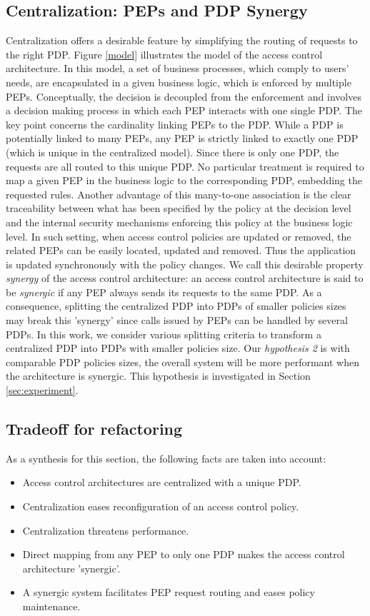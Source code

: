 \subsection{Centralization: PEPs and PDP Synergy}
Centralization offers a desirable feature by simplifying the routing of requests to the right PDP. 
Figure \ref{model} illustrates the model of the access control architecture. In this model, a set of business processes, which comply to users' needs, are encapsulated 
in a given business logic, which is enforced by multiple PEPs. Conceptually, the decision is decoupled from the enforcement and involves a decision making process in which each PEP 
interacts with one single PDP. The key point concerns the cardinality linking PEPs to the PDP. While a PDP is potentially linked to many PEPs, any PEP is strictly linked to exactly one 
PDP (which is unique in the centralized model). 
Since there is only one PDP, the requests are all routed to this unique PDP. No particular treatment is required to map a given PEP in the business logic to 
the corresponding PDP, embedding the requested rules. Another advantage of this many-to-one association is the clear traceability between what has been specified by the 
policy at the decision level and the internal security mechanisms enforcing this policy at the business logic level. In such setting, 
when access control policies are updated or removed, the related PEPs can be easily located, updated and removed. Thus the application is updated synchronously 
with the policy changes. We call this desirable property \textit{synergy} of the access control architecture: an access control architecture is said to be \textit{synergic} if any PEP always sends 
its requests to the same PDP. 
As a consequence, splitting the centralized PDP into PDPs of smaller policies sizes may break this 'synergy' since calls issued by PEPs can be handled by several PDPs. 
In this work, we consider various splitting criteria to transform a centralized PDP into PDPs with smaller policies size. 
Our \textit{hypothesis 2} is with comparable PDP policies sizes, the overall system will be more performant when the architecture is synergic. This hypothesis is investigated in 
Section \ref{sec:experiment}.

\subsection{Tradeoff for refactoring }

As a synthesis for this section, the following facts are taken into account:
\begin{itemize}
 \item Access control architectures are centralized with a unique PDP.
\item Centralization eases reconfiguration of an access control policy.
\item Centralization threatens performance.
\item Direct mapping from any PEP to only one PDP makes the access control architecture 'synergic'.
\item A synergic system facilitates PEP request routing and eases policy maintenance.

\end{itemize}

